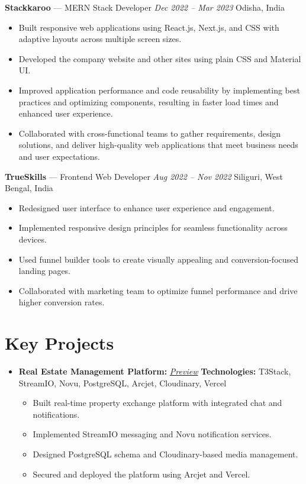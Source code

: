 \documentclass[10pt,a4paper]{article}
\begin{document}
{\textbf{Stackkaroo} — MERN Stack Developer \hfill \textit{Dec 2022 – Mar 2023}  
Odisha, India
\vspace{-5pt}  
\begin{itemize}[leftmargin=*, noitemsep]
    \item Built responsive web applications using React.js, Next.js, and CSS with adaptive layouts across multiple screen sizes.
    \item Developed the company website and other sites using plain CSS and Material UI.
    \item Improved application performance and code reusability by implementing best practices and optimizing components, resulting in faster load times and enhanced user experience.
    \item Collaborated with cross-functional teams to gather requirements, design solutions, and deliver high-quality web applications that meet business needs and user expectations.
\end{itemize}

\textbf{TrueSkills} — Frontend Web Developer \hfill \textit{Aug 2022 – Nov 2022}  
Siliguri, West Bengal, India
\vspace{-5pt}  
\begin{itemize}[leftmargin=*, noitemsep]
    \item Redesigned user interface to enhance user experience and engagement.
    \item Implemented responsive design principles for seamless functionality across devices.
    \item Used funnel builder tools to create visually appealing and conversion-focused landing pages.
    \item Collaborated with marketing team to optimize funnel performance and drive higher conversion rates.
\end{itemize}

\section*{Key Projects}
\vspace{-10pt}
\begin{itemize}[leftmargin=*, noitemsep]
    \item \textbf{Real Estate Management Platform:}  \hfill \textit{\href{https://github.com/abhijit47}{\color{blue}Preview}}
    \newline
    {\small \textbf{Technologies:} T3Stack, StreamIO, Novu, PostgreSQL, Arcjet, Cloudinary, Vercel}
    \begin{itemize}[leftmargin=*, noitemsep]
        \item Built real-time property exchange platform with integrated chat and notifications.
        \item Implemented StreamIO messaging and Novu notification services.
        \item Designed PostgreSQL schema and Cloudinary-based media management.
        \item Secured and deployed the platform using Arcjet and Vercel.
    \end{itemize}


\end{itemize}}
\end{document}
